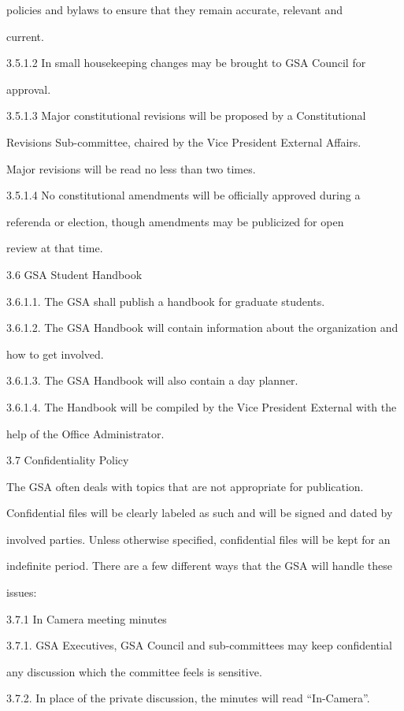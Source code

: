  policies and bylaws to ensure that they remain accurate, relevant and 
 
 current. 
 
 3.5.1.2 In small housekeeping changes may be brought to GSA Council for 
 
 approval. 
 
 3.5.1.3 Major constitutional revisions will be proposed by a Constitutional 
 
 Revisions Sub-committee, chaired by the Vice President External Affairs. 
 
 Major revisions will be read no less than two times. 
 
 3.5.1.4 No constitutional amendments will be officially approved during a 
 
 referenda or election, though amendments may be publicized for open 
 
 review at that time. 

 3.6 GSA Student Handbook 
 
 
 3.6.1.1. The GSA shall publish a handbook for graduate students. 
 
 3.6.1.2. The GSA Handbook will contain information about the organization and 
 
 how to get involved. 
 
 3.6.1.3. The GSA Handbook will also contain a day planner. 
 
 3.6.1.4. The Handbook will be compiled by the Vice President External with the 
 
 help of the Office Administrator. 
 
 3.7 Confidentiality Policy 
 
 The GSA often deals with topics that are not appropriate for publication. 
 
 Confidential files will be clearly labeled as such and will be signed and dated by 
 
 involved parties. Unless otherwise specified, confidential files will be kept for an 
 
 indefinite period. There are a few different ways that the GSA will handle these 
 
 issues: 
 
 3.7.1 In Camera meeting minutes 
 
 3.7.1. GSA Executives, GSA Council and sub-committees may keep confidential 
 
 any discussion which the committee feels is sensitive. 
 
 3.7.2. In place of the private discussion, the minutes will read “In-Camera”. 
 
